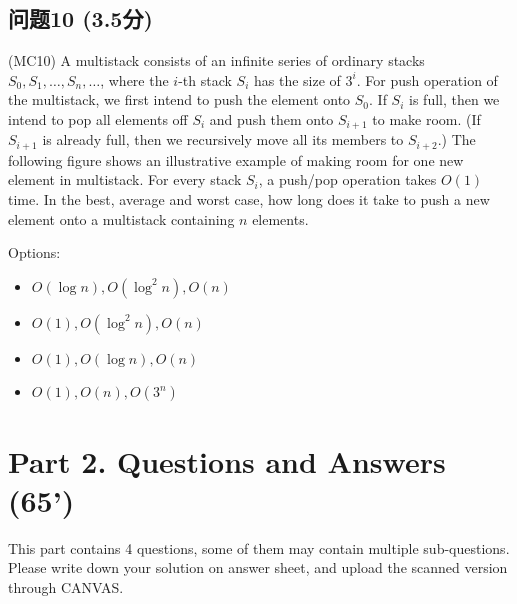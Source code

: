 \documentclass[11pt, a4paper]{article}
\begin{document}
\subsection*{问题10 (3.5分)}
(MC10) A multistack consists of an infinite series of ordinary stacks \(S_0, S_1, \ldots, S_n, \ldots\), where the \(i\)-th stack \(S_i\) has the size of \(3^i\). For push operation of the multistack, we first intend to push the element onto \(S_0\). If \(S_i\) is full, then we intend to pop all elements off \(S_i\) and push them onto \(S_{i+1}\) to make room. (If \(S_{i+1}\) is already full, then we recursively move all its members to \(S_{i+2}\).) The following figure shows an illustrative example of making room for one new element in multistack. For every stack \(S_i\), a push/pop operation takes \(O(1)\) time. In the best, average and worst case, how long does it take to push a new element onto a multistack containing \(n\) elements.


Options:
\begin{itemize}
    \item \(O(\log n), O(\log^2 n), O(n)\)
    \item \(O(1), O(\log^2 n), O(n)\)
    \item \(O(1), O(\log n), O(n)\)
    \item \(O(1), O(n), O(3^n)\)
\end{itemize}

\newpage
\section*{Part 2. Questions and Answers (65')}
This part contains 4 questions, some of them may contain multiple sub-questions. Please write down your solution on answer sheet, and upload the scanned version through CANVAS.
\end{document}

